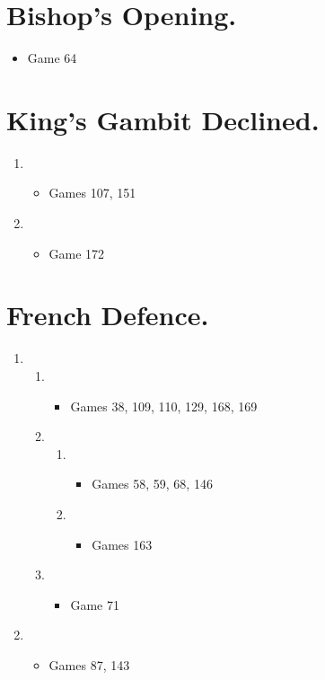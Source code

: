 \begin{multicols}{2}
\section{Bishop's Opening.}
\newgame{}
\begin{itemize}
\item Game 64
\end{itemize}

\section{King's Gambit Declined.}
\newgame{}
\begin{enumerate}
\item {}
\begin{itemize}
\item Games 107, 151
\end{itemize}
\item {}
\begin{itemize}
\item Game 172
\end{itemize}
\end{enumerate}

\section{French Defence.}
\newgame{}
\begin{enumerate}
\item {}
\begin{enumerate}
\item {}
\begin{itemize}
\item Games 38, 109, 110, 129, 168, 169
\end{itemize}
\item {}
\begin{enumerate}
\item {}
\begin{itemize}
\item Games 58, 59, 68, 146
\end{itemize}
\item {}
\begin{itemize}
\item Games 163
\end{itemize}
\end{enumerate}
\item {}
\begin{itemize}
\item Game 71
\end{itemize}
\end{enumerate}
\item {}
\begin{itemize}
\item Games 87, 143
\end{itemize}
\end{enumerate}


\end{multicols}
